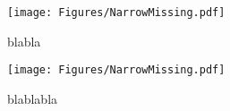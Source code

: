{
\begin{figure*}[th]
\begin{minipage}{\figWidth}
\begin{center}
\centerline{\texttt{[image: Figures/NarrowMissing.pdf]}}
{
blabla
}
\end{center}
\end{minipage}
\begin{minipage}{\figSep}
\hspace{\figSep}
\end{minipage}
\begin{minipage}{\figWidth}
\begin{center}
\centerline{\texttt{[image: Figures/NarrowMissing.pdf]}}
{
blablabla
}
\end{center}
\end{minipage}
\end{figure*}
}
